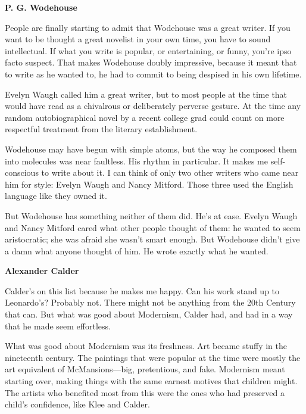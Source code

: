                   \textbf{P. G. Wodehouse}

People are finally starting
                  to admit that Wodehouse was a great writer. If you want to be
                  thought a great novelist in your own time, you have to sound
                  intellectual. If what you write is popular, or entertaining,
                  or funny, you're ipso facto suspect. That makes Wodehouse
                  doubly impressive, because it meant that to write as he wanted
                  to, he had to commit to being despised in his own lifetime.

Evelyn
                  Waugh called him a great writer, but to most people at the
                  time that would have read as a chivalrous or deliberately
                  perverse gesture. At the time any random autobiographical
                  novel by a recent college grad could count on more respectful
                  treatment from the literary establishment.

Wodehouse
                  may have begun with simple atoms, but the way he composed them
                  into molecules was near faultless. His rhythm in particular.
                  It makes me self-conscious to write about it. I can think of
                  only two other writers who came near him for style: Evelyn
                  Waugh and Nancy Mitford. Those three used the English language
                  like they owned it.

But Wodehouse has something
                  neither of them did. He's at ease. Evelyn Waugh and Nancy
                  Mitford cared what other people thought of them: he wanted to
                  seem aristocratic; she was afraid she wasn't smart enough. But
                  Wodehouse didn't give a damn what anyone thought of him. He
                  wrote exactly what he wanted.


                  \textbf{Alexander Calder}

Calder's on this list
                  because he makes me happy. Can his work stand up to
                  Leonardo's? Probably not. There might not be anything from the
                  20th Century that can. But what was good about Modernism,
                  Calder had, and had in a way that he made seem effortless.

What
                  was good about Modernism was its freshness. Art became stuffy
                  in the nineteenth century. The paintings that were popular at
                  the time were mostly the art equivalent of
                  McMansions---big, pretentious, and fake. Modernism meant
                  starting over, making things with the same earnest motives
                  that children might. The artists who benefited most from this
                  were the ones who had preserved a child's confidence, like
                  Klee and Calder.

